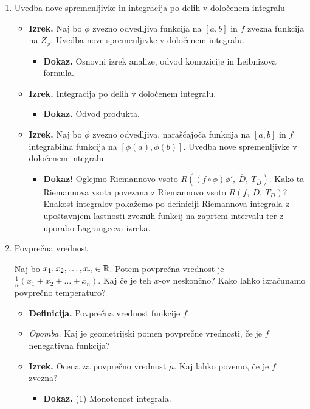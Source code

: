 \begin{enumerate}
    \newpage
    \item Uvedba nove spremenljivke in integracija po delih v določenem integralu
    \begin{itemize}
        \item \colorbox{blue!30}{\textbf{Izrek.}} Naj bo $\phi$ zvezno odvedljiva funkcija na $[a,b]$ in $f$ zvezna funkcija na $Z_\phi$. Uvedba nove spremenljivke v določenem integralu.
        \begin{itemize}
            \item \colorbox{green!30}{\textbf{Dokaz.}} Osnovni izrek analize, odvod komozicije in Leibnizova formula.
        \end{itemize}
        \item \colorbox{blue!30}{\textbf{Izrek.}} Integracija po delih v določenem integralu.
        \begin{itemize}
            \item \colorbox{green!30}{\textbf{Dokaz.}} Odvod produkta.
        \end{itemize}
        \item \colorbox{blue!30}{\textbf{Izrek.}} Naj bo $\phi$ zvezno odvedljiva, naraščajoča funkcija na $[a,b]$ in $f$ integrabilna funkcija na $[\phi(a), \phi(b)]$. Uvedba nove spremenljivke v določenem integralu.
        \begin{itemize}
            \item \colorbox{green!50}{\textbf{Dokaz!}} Oglejmo Riemannovo vsoto $R((f \circ \phi) \phi', \ \overline{D}, \ T_{\overline{D}})$. Kako ta Riemannova vsota povezana z Riemannovo vsoto $R(f,\ D,\ T_D)$? Enakost integralov pokažemo po definiciji Riemannova integrala z upoštavnjem lastnosti zveznih funkcij na zaprtem intervalu ter z uporabo Lagrangeeva izreka.
        \end{itemize} 
    \end{itemize}

    \item Povprečna vrednost
    
    Naj bo $x_1, x_2, \ldots, x_n \in \mathbb{R}$. Potem povprečna vrednost je $\frac{1}{n} (x_1 + x_2 + \ldots + x_n)$. Kaj če je teh $x$-ov neskončno? Kako lahko izračunamo povprečno temperaturo?
    \begin{itemize}
        \item \colorbox{purple!30}{\textbf{Definicija.}} Povprečna vrednost funkcije $f$.
        \item \colorbox{yellow!30}{\emph{Opomba.}} Kaj je geometrijski pomen povprečne vrednosti, če je $f$ nenegativna funkcija?
        \item \colorbox{blue!30}{\textbf{Izrek.}} Ocena za povprečno vrednost $\mu$. Kaj lahko povemo, če je $f$ zvezna? 
        \begin{itemize}
            \item \colorbox{green!30}{\textbf{Dokaz.}} (1) Monotonost integrala.
            

\end{itemize}
\end{itemize}
\end{enumerate}
